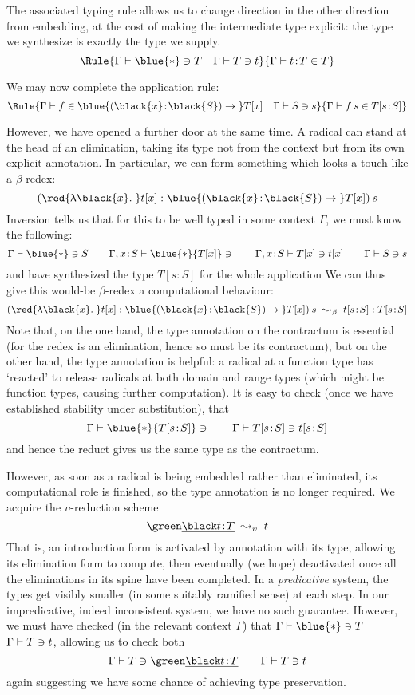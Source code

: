\documentclass[natbib]{article}
\newcommand{\type}{\blue{\ast}}
\newcommand{\hb}{\!:\!}
\newcommand{\PI}[2]{\blue{(\black{#1}\hb \black{#2})\to\;}}
\newcommand{\LA}[1]{\red{\uplambda\black{#1}.\;}}
\begin{document}
The associated typing rule allows us to change direction in the other direction from embedding, at the cost of making the intermediate type explicit: the type we synthesize is exactly the type we supply.
\[\Rule{\CHK\Gamma\type T\quad \CHK\Gamma Tt}
       {\SYN\Gamma{t\hb T}T}
\]

We may now complete the application rule:
\[
\Rule{\SYN\Gamma f {\PI xS T[x]} \quad \CHK\Gamma Ss}
     {\SYN\Gamma{f\:s}{T[s\hb S]}}
\]

However, we have opened a further door at the same time. A radical can stand at the head of an elimination, taking its type not from the context but from its own explicit annotation. In particular, we can form something which looks a touch like a $\beta$-redex:
\[
(\LA xt[x] : \PI xS T[x])\:s
\]
Inversion tells us that for this to be well typed in some context $\Gamma$, we must know the following:
\[
\CHK\Gamma\type S \qquad
\CHK{\Gamma,x\hb S}\type{T[x]} \qquad
\CHK{\Gamma,x\hb S}{T[x]}{t[x]} \qquad
\CHK\Gamma Ss
\]
and have synthesized the type $T[s\hb S]$ for the whole application
We can thus give this would-be $\beta$-redex a computational behaviour:
\[
(\LA xt[x] : \PI xS T[x])\:s \;\leadsto_\beta\; t[s\hb S]:T[s\hb S]
\]
Note that, on the one hand, the type annotation on the contractum is essential (for the redex is an elimination, hence so must be its contractum), but on the other hand, the type annotation is helpful: a radical at a function type has `reacted' to release radicals at both domain and range types (which might be function types, causing further computation). It is easy to check (once we have established stability under substitution), that
\[
\CHK\Gamma\type{T[s\hb S]} \qquad
\CHK\Gamma{T[s\hb S]}{t[s\hb S]}
\]
and hence the reduct gives us the same type as the contractum.

However, as soon as a radical is being embedded rather than eliminated, its computational role is finished, so the type annotation is no longer required. We acquire the $\upsilon$-reduction scheme
\[
\el{t\hb T} \;\leadsto_\upsilon\; t
\]
That is, an introduction form is activated by annotation with its type, allowing its elimination form to compute, then eventually (we hope) deactivated once all the eliminations in its spine have been completed. In a \emph{predicative} system, the types get visibly smaller (in some suitably ramified sense) at each step. In our impredicative, indeed inconsistent system, we have no such guarantee. However, we must have checked (in the relevant context $\Gamma$) that $\CHK\Gamma\type T$ $\Gamma \vdash T \ni t$, allowing us to check both
\[
\CHK\Gamma T{\el{t\hb T}} \qquad \CHK\Gamma Tt
\]
again suggesting we have some chance of achieving type preservation.
\end{document}
